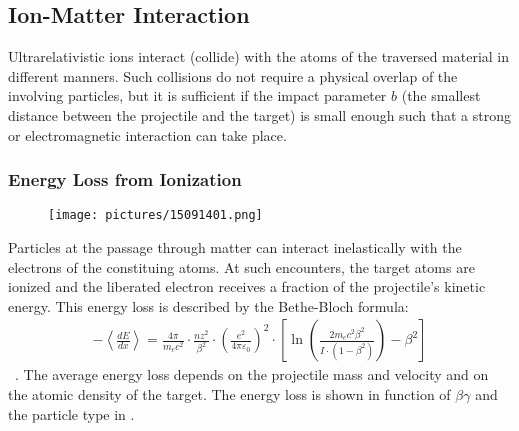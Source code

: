 \subsection{Ion-Matter Interaction} \label{chap:ionmatterinteraction}

Ultrarelativistic ions interact (collide) with the atoms of the traversed material in different manners. Such collisions do not require a physical overlap of the involving particles, but it is sufficient if the impact parameter $b$ (the smallest distance between the projectile and the target) is small enough such that a strong or electromagnetic interaction can take place. 

\subsubsection{Energy Loss from Ionization}

  \begin{figure}[b]
  \centering
  \texttt{[image: pictures/15091401.png]}
  \caption{}  
  \label{pic:15091401}
  \end{figure}

Particles at the passage through matter can interact inelastically with the electrons of the constituing atoms. At such encounters, the target atoms are ionized and the liberated electron receives a fraction of the projectile's kinetic energy. This energy loss is described by the Bethe-Bloch formula:
\begin{align}
- \left\langle\frac{dE}{dx}\right\rangle = \frac{4 \pi}{m_e c^2} \cdot \frac{nz^2}{\beta^2} \cdot \left(\frac{e^2}{4\pi\varepsilon_0}\right)^2 \cdot \left[\ln \left(\frac{2m_e c^2 \beta^2}{I \cdot (1-\beta^2)}\right) - \beta^2\right]
\end{align} \, .
The average energy loss depends on the projectile mass and velocity and on the atomic density of the target. The energy loss is shown in function of $\beta \gamma$ and the particle type in .

